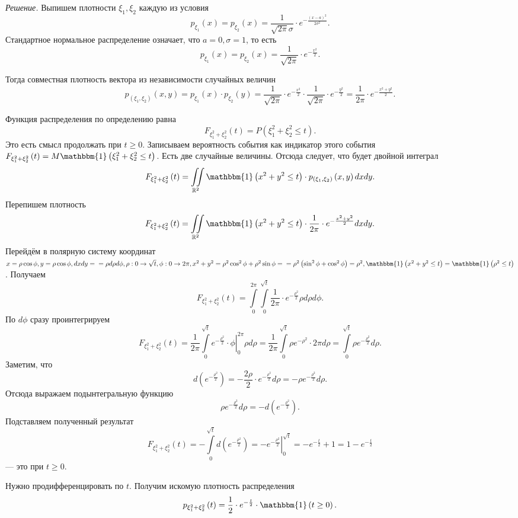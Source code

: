 \textit{Решение.} Выпишем плотности $ \xi_1, \xi_2$ каждую из условия
$$p_{ \xi_1} \left( x \right) =
p_{ \xi_2} \left( x \right) =
\frac{1}{ \sqrt{2 \pi} \sigma} \cdot e^{- \frac{ \left( x - a \right)^2}{2 \sigma^2}}.$$
Стандартное нормальное распределение означает, что $a = 0, \sigma = 1$, то есть
$$p_{ \xi_1} \left( x \right) =
p_{ \xi_2} \left( x \right) =
\frac{1}{ \sqrt{2 \pi}} \cdot e^{- \frac{x^2}{2}}.$$

Тогда совместная плотность вектора из независимости случайных величин
$$p_{ \left( \xi_1, \xi_2 \right) } \left( x, y \right) =
p_{ \xi_1} \left( x \right) \cdot p_{ \xi_2} \left( y \right) =
\frac{1}{ \sqrt{2 \pi }} \cdot e^{- \frac{x^2}{2}} \cdot \frac{1}{ \sqrt{2 \pi }} \cdot e^{- \frac{y^2}{2}} =
\frac{1}{2 \pi } \cdot e^{- \frac{x^2 + y^2}{2}}.$$

Функция распределения по определению равна
$$F_{ \xi_1^2 + \xi_2^2} \left( t \right) =
P \left( \xi_1^2 + \xi_2^2 \leq t \right).$$
Это есть смысл продолжать при $t \geq 0$.
Записываем вероятность события как индикатор этого события $F_{ \xi_1^2 + \xi_2^2} \left( t \right) = M \mathbbm{1} \left( \xi_1^2 + \xi_2^2 \leq t \right) $.
Есть две случайные величины.
Отсюда следует, что будет двойной интеграл
$$F_{ \xi_1^2 + \xi_2^2} \left( t \right) =
\iint \limits_{ \mathbb{R}^2} \mathbbm{1} \left( x^2 + y^2 \leq t \right) \cdot p_{ \left( \xi_1, \xi_2 \right) } \left( x, y \right) dxdy.$$
Перепишем плотность
$$F_{ \xi_1^2 + \xi_2^2} \left( t \right) =
\iint \limits_{ \mathbb{R}^2} \mathbbm{1} \left( x^2 + y^2 \leq t \right) \cdot \frac{1}{2 \pi } \cdot e^{- \frac{x^2 + y^2}{2}} dxdy.$$
Перейдём в полярную систему координат
$x = \rho \cos \phi,
y = \rho \cos \phi,
dxdy = \\
= \rho d \rho d \phi,
\rho: 0 \rightarrow \sqrt{t},
\phi: 0 \rightarrow 2 \pi,
x^2 + y^2 = \rho^2 \cos^2 \phi + \rho^2 \sin \phi = \\
= \rho^2 \left( \sin^2 \phi + \cos^2 \phi \right) = \rho^2,
\mathbbm{1} \left( x^2 + y^2 \leq t \right) = \mathbbm{1} \left( \rho^2 \leq t \right) $.
Получаем
$$F_{ \xi_1^2 + \xi_2^2} \left( t \right) =
\int \limits_0^{2 \pi } \int \limits_0^{ \sqrt{t}} \frac{1}{2 \pi } \cdot e^{- \frac{ \rho^2}{2}} \rho d \rho d \phi.$$
По $d \phi $ сразу проинтегрируем
$$F_{ \xi_1^2 + \xi_2^2} \left( t \right) =
\frac{1}{2 \pi } \int \limits_0^{ \sqrt{t}} \left. e^{- \frac{ \rho^2}{2}} \cdot \phi \right|_0^{2 \pi } \rho d \rho =
\frac{1}{2 \pi } \int \limits_0^{ \sqrt{t}} \rho e^{- \rho^2} \cdot 2 \pi d \rho =
\int \limits_0^{ \sqrt{t}} \rho e^{- \frac{ \rho^2}{2}} d \rho.$$
Заметим, что
$$d \left( e^{- \frac{ \rho^2}{2}} \right) =
- \frac{2 \rho }{2} \cdot e^{- \frac{ \rho^2}{2}} d \rho =
- \rho e^{- \frac{ \rho^2}{2}} d \rho.$$
Отсюда выражаем подынтегральную функцию
$$ \rho e^{- \frac{ \rho^2}{2}} d \rho =
-d \left( e^{- \frac{ \rho^2}{2}} \right) .$$
Подставляем полученный результат
$$F_{ \xi_1^2 + \xi_2^2} \left( t \right) =
- \int \limits_0^{ \sqrt{t}} d \left( e^{- \frac{ \rho^2}{2}} \right) =
\left. - e^{- \frac{ \rho^2}{2}} \right|_0^{ \sqrt{t}} =
-e^{- \frac{t}{2}} + 1 =
1 - e^{- \frac{t}{2}}$$
--- это при $t \geq 0$.

Нужно продифференцировать по $t$.
Получим искомую плотность распределения
$$p_{ \xi_1^2 + \xi_2^2} \left( t \right) =
\frac{1}{2} \cdot e^{- \frac{t}{2}} \cdot \mathbbm{1} \left( t \geq 0 \right).$$
